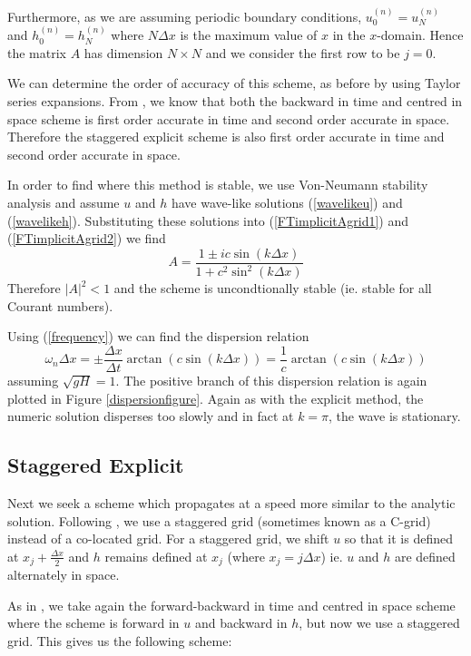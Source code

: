 \documentclass[a4paper,12pt, notitlepage]{article}
\begin{document}
Furthermore, as we are assuming periodic boundary conditions, $u_{0}^{(n)} = u_{N}^{(n)}$ and $h_{0}^{(n)} = h_{N}^{(n)}$ where $N\Delta x$ is the maximum value of $x$ in the $x$-domain. Hence the matrix $A$ has dimension $N \times N$ and we consider the first row to be $j = 0$. 

We can determine the order of accuracy of this scheme, as before by using Taylor series expansions.  From \cite{MPE textbook}, we know that both the backward in time and centred in space scheme is first order accurate in time and second order accurate in space. Therefore the staggered explicit scheme is also first order accurate in time and second order accurate in space.

In order to find where this method is stable, we use Von-Neumann stability analysis and assume $u$ and $h$ have wave-like solutions (\ref{wavelikeu}) and (\ref{wavelikeh}). Substituting these solutions into (\ref{FTimplicitAgrid1}) and (\ref{FTimplicitAgrid2}) we find
\begin{equation}
A = \frac{1 \pm i c\sin(k\Delta x)}{1 + c^{2}\sin^{2}(k\Delta x)}
\end{equation}
Therefore $\lvert A \rvert ^{2} < 1$ and the scheme is uncondtionally stable (ie. stable for all Courant numbers). 

Using (\ref{frequency}) we can find the dispersion relation
\begin{equation}
\omega_{n} \Delta x = \pm\frac{\Delta x}{\Delta t} \arctan(c\sin(k\Delta x)) = \frac{1}{c}  \arctan(c\sin(k\Delta x))
\end{equation}
assuming $\sqrt{gH} = 1$. The positive branch of this dispersion relation is again plotted in Figure \ref{dispersionfigure}. Again as with the explicit method, the numeric solution disperses too slowly and in fact at $k = \pi$, the wave is stationary. 

\subsection{Staggered Explicit}
Next we seek a scheme which propagates at a speed more similar to the analytic solution. Following \cite{MPE textbook}, we use a staggered grid (sometimes known as a C-grid) instead of a co-located grid. For a staggered grid, we shift $u$ so that it is defined at $x_{j} + \frac{\Delta x}{2}$ and $h$ remains defined at $x_{j}$ (where $x_{j} = j \Delta x$) ie. $u$ and $h$ are defined alternately in space.

As in \cite{MPE textbook}, we take again the forward-backward in time and centred in space scheme where the scheme is forward in $u$ and backward in $h$, but now we use a staggered grid. This gives us the following scheme:
\end{document}
